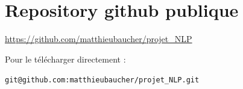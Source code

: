 \documentclass[12pt]{article}
\begin{document}
\section{Repository github publique}

\url{https://github.com/matthieubaucher/projet_NLP}

Pour le télécharger directement : 

\texttt{git@github.com:matthieubaucher/projet_NLP.git}
\end{document}
